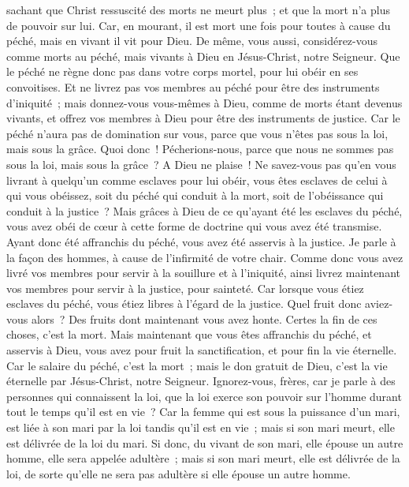 \begin{multicols}{2}
sachant que Christ ressuscité des morts ne meurt plus~; et que la mort n'a plus de pouvoir sur lui.
Car, en mourant, il est mort une fois pour toutes à cause du péché, mais en vivant il vit pour Dieu.
De même, vous aussi, considérez-vous comme morts au péché, mais vivants à Dieu en Jésus-Christ, notre Seigneur.
Que le péché ne règne donc pas dans votre corps mortel, pour lui obéir en ses convoitises.
Et ne livrez pas vos membres au péché pour être des instruments d'iniquité~; mais donnez-vous vous-mêmes à Dieu, comme de morts étant devenus vivants, et offrez vos membres à Dieu pour être des instruments de justice.
Car le péché n'aura pas de domination sur vous, parce que vous n'êtes pas sous la loi, mais sous la grâce.
Quoi donc~! Pécherions-nous, parce que nous ne sommes pas sous la loi, mais sous la grâce~? A Dieu ne plaise~!
Ne savez-vous pas qu'en vous livrant à quelqu'un comme esclaves pour lui obéir, vous êtes esclaves de celui à qui vous obéissez, soit du péché qui conduit à la mort, soit de l'obéissance qui conduit à la justice~?
Mais grâces à Dieu de ce qu'ayant été les esclaves du péché, vous avez obéi de cœur à cette forme de doctrine qui vous avez été transmise.
Ayant donc été affranchis du péché, vous avez été asservis à la justice.
Je parle à la façon des hommes, à cause de l'infirmité de votre chair. Comme donc vous avez livré vos membres pour servir à la souillure et à l'iniquité, ainsi livrez maintenant vos membres pour servir à la justice, pour sainteté.
Car lorsque vous étiez esclaves du péché, vous étiez libres à l'égard de la justice.
Quel fruit donc aviez-vous alors~? Des fruits dont maintenant vous avez honte. Certes la fin de ces choses, c'est la mort.
Mais maintenant que vous êtes affranchis du péché, et asservis à Dieu, vous avez pour fruit la sanctification, et pour fin la vie éternelle.
Car le salaire du péché, c'est la mort~; mais le don gratuit de Dieu, c'est la vie éternelle par Jésus-Christ, notre Seigneur.
\VerseOne{}Ignorez-vous, frères, car je parle à des personnes qui connaissent la loi, que la loi exerce son pouvoir sur l'homme durant tout le temps qu'il est en vie~?
Car la femme qui est sous la puissance d'un mari, est liée à son mari par la loi tandis qu'il est en vie~; mais si son mari meurt, elle est délivrée de la loi du mari.
Si donc, du vivant de son mari, elle épouse un autre homme, elle sera appelée adultère~; mais si son mari meurt, elle est délivrée de la loi, de sorte qu'elle ne sera pas adultère si elle épouse un autre homme.

\end{multicols}
